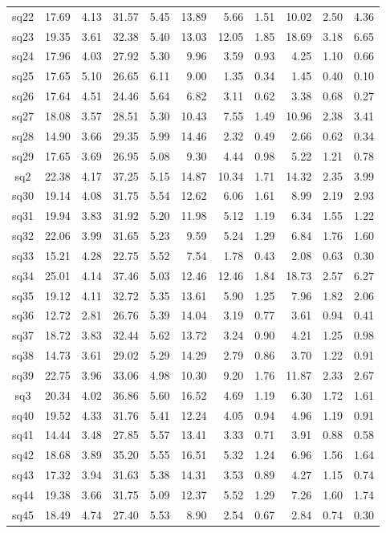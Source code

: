 {\begin{longtable}{@{}cr@{\hspace{1em}}r@{\hspace{1em}}r@{\hspace{1em}}r@{\hspace{1em}}r@{\hspace{2em}}r@{\hspace{1em}}r@{\hspace{1em}}r@{\hspace{1em}}r@{\hspace{1em}}r@{}}
sq22&17.69&4.13&31.57&5.45&13.89&5.66&1.51&10.02&2.50&4.36\\
sq23&19.35&3.61&32.38&5.40&13.03&12.05&1.85&18.69&3.18&6.65\\
sq24&17.96&4.03&27.92&5.30&9.96&3.59&0.93&4.25&1.10&0.66\\
sq25&17.65&5.10&26.65&6.11&9.00&1.35&0.34&1.45&0.40&0.10\\
sq26&17.64&4.51&24.46&5.64&6.82&3.11&0.62&3.38&0.68&0.27\\
sq27&18.08&3.57&28.51&5.30&10.43&7.55&1.49&10.96&2.38&3.41\\
sq28&14.90&3.66&29.35&5.99&14.46&2.32&0.49&2.66&0.62&0.34\\
sq29&17.65&3.69&26.95&5.08&9.30&4.44&0.98&5.22&1.21&0.78\\
sq2&22.38&4.17&37.25&5.15&14.87&10.34&1.71&14.32&2.35&3.99\\
sq30&19.14&4.08&31.75&5.54&12.62&6.06&1.61&8.99&2.19&2.93\\
sq31&19.94&3.83&31.92&5.20&11.98&5.12&1.19&6.34&1.55&1.22\\
sq32&22.06&3.99&31.65&5.23&9.59&5.24&1.29&6.84&1.76&1.60\\
sq33&15.21&4.28&22.75&5.52&7.54&1.78&0.43&2.08&0.63&0.30\\
sq34&25.01&4.14&37.46&5.03&12.46&12.46&1.84&18.73&2.57&6.27\\
sq35&19.12&4.11&32.72&5.35&13.61&5.90&1.25&7.96&1.82&2.06\\
sq36&12.72&2.81&26.76&5.39&14.04&3.19&0.77&3.61&0.94&0.41\\
sq37&18.72&3.83&32.44&5.62&13.72&3.24&0.90&4.21&1.25&0.98\\
sq38&14.73&3.61&29.02&5.29&14.29&2.79&0.86&3.70&1.22&0.91\\
sq39&22.75&3.96&33.06&4.98&10.30&9.20&1.76&11.87&2.33&2.67\\
sq3&20.34&4.02&36.86&5.60&16.52&4.69&1.19&6.30&1.72&1.61\\
sq40&19.52&4.33&31.76&5.41&12.24&4.05&0.94&4.96&1.19&0.91\\
sq41&14.44&3.48&27.85&5.57&13.41&3.33&0.71&3.91&0.88&0.58\\
sq42&18.68&3.89&35.20&5.55&16.51&5.32&1.24&6.96&1.56&1.64\\
sq43&17.32&3.94&31.63&5.38&14.31&3.53&0.89&4.27&1.15&0.74\\
sq44&19.38&3.66&31.75&5.09&12.37&5.52&1.29&7.26&1.60&1.74\\
sq45&18.49&4.74&27.40&5.53&8.90&2.54&0.67&2.84&0.74&0.30\\

\end{longtable}}
